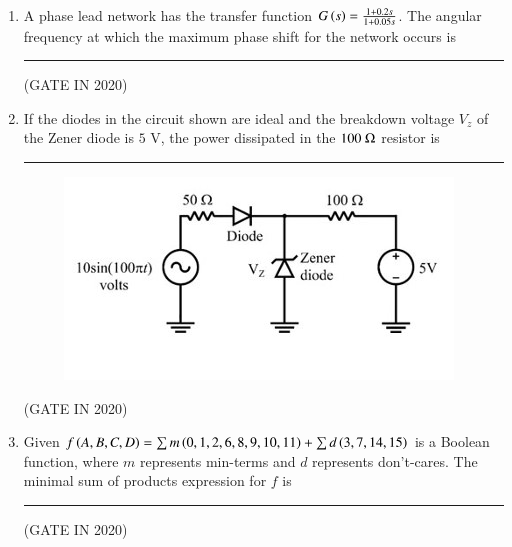 \documentclass[journal,12pt,onecolumn]{IEEEtran}
\theoremstyle{remark}
\begin{document}
\begin{enumerate}
\item A phase lead network has the transfer function $G\left(s\right) = \frac{1+0.2s}{1+0.05s}$. The angular frequency at which the maximum phase shift for the network occurs is \rule{2cm}{0.4pt}

\hfill{(GATE IN 2020)}
\begin{enumerate}
\end{enumerate}

\item If the diodes in the circuit shown are ideal and the breakdown voltage $V_z$ of the Zener diode is $5$ V, the power dissipated in the $100~\ohm$ resistor  is \rule{2cm}{0.4pt}
\begin{figure}[H]
\centering
\includegraphics[width=0.5\columnwidth]{figs/q7.jpg}
\caption*{}
\label{fig:q7}
\end{figure}

\hfill{(GATE IN 2020)}
\begin{enumerate}
\end{enumerate}

\item Given $f \left(A, B, C, D\right) = \sum m\left(0, 1, 2, 6, 8, 9, 10, 11\right) + \sum d\left(3, 7, 14, 15\right)$ is a Boolean function, where $m$ represents min-terms and $d$ represents don't-cares. The minimal sum of products expression for $f$ is \rule{2cm}{0.4pt}

\hfill{(GATE IN 2020)}
\begin{enumerate}
\end{enumerate}


\end{enumerate}
\end{document}
